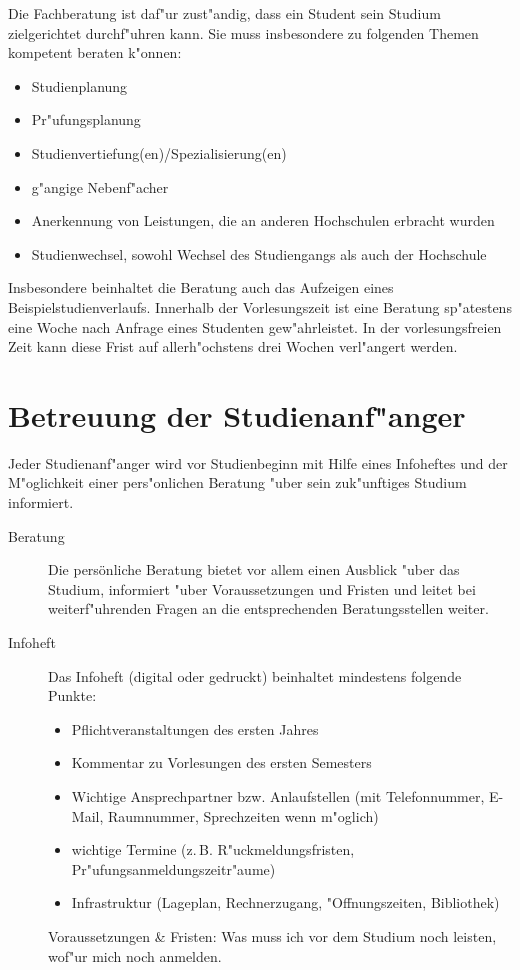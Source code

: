 Die Fachberatung ist daf"ur zust"andig, dass ein Student sein Studium
zielgerichtet durchf"uhren kann. Sie muss insbesondere zu folgenden
Themen kompetent beraten k"onnen:
\begin{itemize}
	\item Studienplanung
	\item Pr"ufungsplanung
	\item Studienvertiefung(en)/Spezialisierung(en)
	\item g"angige Nebenf"acher
	\item Anerkennung von Leistungen, die an anderen Hochschulen erbracht wurden
	\item Studienwechsel, sowohl Wechsel des Studiengangs als auch der Hochschule
\end{itemize}

Insbesondere beinhaltet die Beratung auch das Aufzeigen eines Beispielstudienverlaufs.
Innerhalb der Vorlesungszeit ist eine Beratung sp"atestens eine Woche nach
Anfrage eines Studenten gew"ahrleistet. In der vorlesungsfreien Zeit
kann diese Frist auf allerh"ochstens drei Wochen verl"angert werden.

\section{Betreuung der Studienanf"anger}

Jeder Studienanf"anger wird vor Studienbeginn mit Hilfe eines Infoheftes und der M"oglichkeit einer pers"onlichen Beratung "uber sein zuk"unftiges Studium informiert.

\begin{description}
	\item [Beratung] Die persönliche Beratung bietet vor allem einen Ausblick "uber das Studium, informiert "uber Voraussetzungen und Fristen und leitet bei weiterf"uhrenden Fragen an die entsprechenden Beratungsstellen weiter.

	\item [Infoheft] Das Infoheft (digital oder gedruckt) beinhaltet mindestens folgende Punkte:
	\begin{itemize}
		\item Pflichtveranstaltungen des ersten Jahres 
		\item Kommentar zu Vorlesungen des ersten Semesters
		\item Wichtige Ansprechpartner bzw. Anlaufstellen (mit Telefonnummer,
			E-Mail, Raumnummer, Sprechzeiten wenn m"oglich)
		\item wichtige Termine (z.\,B. R"uckmeldungsfristen, Pr"ufungsanmeldungszeitr"aume)
		\item Infrastruktur (Lageplan, Rechnerzugang, "Offnungszeiten, Bibliothek)
	\end{itemize}

	\begin{kcmt}\begin{komacmt}
	Voraussetzungen \& Fristen: Was muss ich vor dem Studium noch leisten,
	wof"ur mich noch anmelden.
	\end{komacmt}\end{kcmt}
\end{description}

